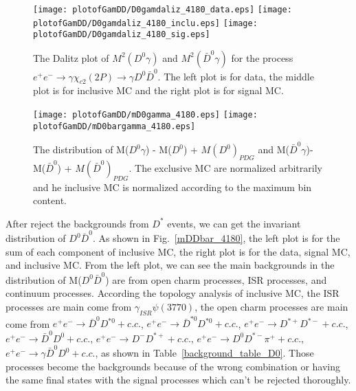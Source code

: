 \documentclass[aps,preprint,tightenlines,superscriptaddress,showpacs,byrevtex,amsmath,amssymb,nofloatfix]{revtex4}
\begin{document}
\begin{figure}[!htbp]
\captionsetup{justification=raggedright}
    \texttt{[image: plotofGamDD/D0gamdaliz\_4180\_data.eps]}
    \texttt{[image: plotofGamDD/D0gamdaliz\_4180\_inclu.eps]}
    \texttt{[image: plotofGamDD/D0gamdaliz\_4180\_sig.eps]}

  \caption{\small The Dalitz plot of $M^{2}(D^{0}\gamma)$ and  $M^{2}(\bar{D}^{0}\gamma)$ for the process $e^{+}e^{-}\rightarrow \gamma \chi_{c2} (2P)\rightarrow \gamma D^{0}\bar{D}^{0}$. The left plot is for data, the middle plot is for inclusive MC and the right plot is for signal MC.}
  \label{D0gamvsD0gam}
\end{figure}


\begin{figure}[!htbp]
 \captionsetup{justification=raggedright}
    \texttt{[image: plotofGamDD/mD0gamma\_4180.eps]}
    \texttt{[image: plotofGamDD/mD0bargamma\_4180.eps]}

  \caption{\small The distribution of M($D^{0}\gamma$) - M($D^{0}$) + $M(D^{0})_{PDG}$ and M($\bar{D}^{0}\gamma$)- M($\bar{D}^{0}$) + $M(\bar{D}^{0})_{PDG}$. The exclusive MC are normalized arbitrarily and he inclusive MC is normalized according to the maximum bin content.}
  \label{MD0gam}
\end{figure}


After reject the backgrounds from $D^{*}$ events, we can get the invariant distribution of $D^{0}\bar{D}^{0}$. As shown in Fig.~\ref{mDDbar_4180}, the left plot is for the sum of each component of inclusive MC, the right plot is for the data, signal MC, and inclusive MC.  From the left plot, we can see the main backgrounds in the distribution of M($D^{0}\bar{D}^{0}$) are from open charm processes, ISR processes, and continuum processes. According the topology analysis of inclusive MC, the ISR processes are main come from $\gamma_{ISR} \psi(3770)$, the open charm processes are main come from $e^{+}e^{-}\rightarrow \bar{D}^{0}D^{*0}+c.c.$, $e^{+}e^{-}\rightarrow \bar{D}^{*0}D^{*0}+c.c.$, $e^{+}e^{-}\rightarrow D^{*+}D^{*-}+c.c.$, $e^{+}e^{-}\rightarrow \bar{D}^{0}D^{0}+c.c.$, $e^{+}e^{-}\rightarrow D^{-}D^{*+}+c.c.$,  $e^{+}e^{-}\rightarrow D^{0}D^{*-}\pi^{+}+c.c.$, $e^{+}e^{-}\rightarrow \gamma \bar{D}^{0}D^{0}+c.c.$, as shown in Table~\ref{background_table_D0}. Those processes become the backgrounds because of the wrong  combination or having the same final states with the signal processes which can't be rejected thoroughly.
\end{document}
